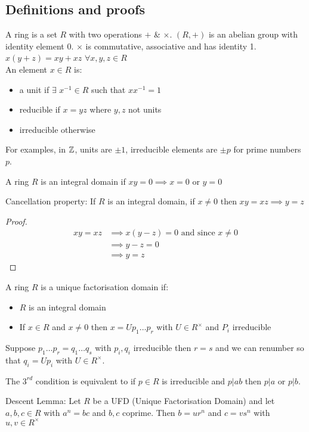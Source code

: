 \documentclass[11pt]{article}
\begin{document}
\subsection{Definitions and proofs}
A ring is a set $R$ with two operations $ + $ \& $  \times $. 
$(R, +)$ is an abelian group with identity element $0$. 
$\times $ is commutative, associative and has identity 1. 
$x(y+z) = xy+xz$ $\forall x,y,z \in R$
$ $\\[1em]
An element $x \in R$ is:
\begin{itemize}
	\item{a unit if $\exists $ $x^{-1} \in R $ such that $xx^{-1} = 1$ }
	\item{reducible if $x=yz $ where $y,z$ not units}
	\item{irreducible otherwise}
\end{itemize}
For examples, in $\mathbb{Z}$, units are $\pm1$, irreducible elements are $\pm p $ for prime numbers $p$.

\begin{defn}
	A ring $R$ is an integral domain if $xy=0 \implies x=0$ or $y=0$
\end{defn}
\begin{lemma}
	Cancellation property: If $R$ is an integral domain, if $x \neq 0$ then $xy=xz \implies y=z$
\end{lemma}
\begin{proof}
	\begin{align*}
	xy =xz &\implies x(y-z) = 0 \text{ and since } x\neq 0\\
		&\implies y-z =0 \\
		&\implies y=z
	\end{align*}
\end{proof}
$ $\\
A ring $R$ is a unique factorisation domain if:
\begin{itemize}
	\item{$R$ is an integral domain}
	\item{If $x \in R$ and $x \neq 0 $ then $x=Up_1 \dots p_r$  with $U \in R^\times $ and $P_i$ irreducible }
\end{itemize}
$ $\\
Suppose $p_1 \dots p_r  = q_1 \dots q_s$ with $p_i, q_i$ irreducible then $r=s$ and we can renumber so that $q_i = Up_i$ with $U \in R^\times$.

The $3^{rd}$ condition is equivalent to if $p \in R$ is irreducible and $p|ab $ then $p| a$ or $p | b$.

\begin{lemma}
	Descent Lemma: Let $R$ be a UFD (Unique Factorisation Domain) and let $a,b,c \in R$ with $a^n = bc $ and $b,c$ coprime.
	Then $b = ur^n$ and $c= vs^n$ with $u,v \in R^\times$
\end{lemma}
\end{document}
